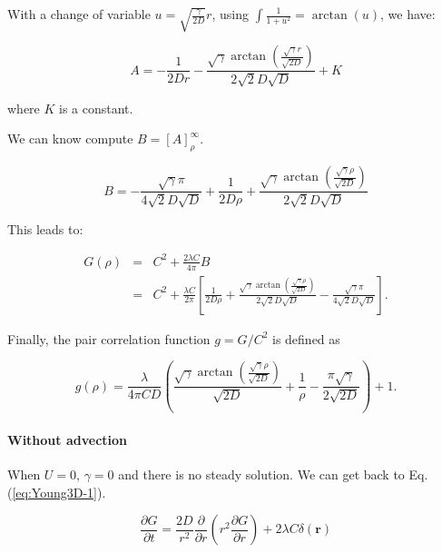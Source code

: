 \documentclass[english]{article}
\begin{document}
With a change of variable $u=\sqrt{\frac{\gamma}{2D}}r$, using $\int\frac{1}{1+u^{2}}=\arctan(u)$,
we have:

\begin{equation}
A=-\frac{1}{2Dr}-\frac{\sqrt{\gamma}\arctan\left(\frac{\sqrt{\gamma}r}{\sqrt{2D}}\right)}{2\sqrt{2}D\sqrt{D}}+K
\end{equation}

where $K$ is a constant.

We can know compute $B=[A]_{\rho}^{\infty}.$ 

\begin{equation}
B=-\frac{\sqrt{\gamma}\pi}{4\sqrt{2}D\sqrt{D}}+\frac{1}{2D\rho}+\frac{\sqrt{\gamma}\arctan\left(\frac{\sqrt{\gamma}\rho}{\sqrt{2D}}\right)}{2\sqrt{2}D\sqrt{D}}
\end{equation}

This leads to:

\begin{equation}
\begin{array}{ccc}
G(\rho) & = & C^{2}+\frac{2\lambda C}{4\pi}B\\
 & = & C^{2}+\frac{\lambda C}{2\pi}\left[\frac{1}{2D\rho}+\frac{\sqrt{\gamma}\arctan\left(\frac{\sqrt{\gamma}\rho}{\sqrt{2D}}\right)}{2\sqrt{2}D\sqrt{D}}-\frac{\sqrt{\gamma}\pi}{4\sqrt{2}D\sqrt{D}}\right].
\end{array}
\end{equation}

Finally, the pair correlation function $g=G/C^{2}$ is defined as

\begin{equation}
g(\rho)=\frac{\lambda}{4\pi CD}\left(\frac{\sqrt{\gamma}\arctan\left(\frac{\sqrt{\gamma}\rho}{\sqrt{2D}}\right)}{\sqrt{2D}}+\frac{1}{\rho}-\frac{\pi\sqrt{\gamma}}{2\sqrt{2D}}\right)+1.\label{eq:pcf_adv_bbm}
\end{equation}


\paragraph{Without advection}

When $U=0$, $\gamma=0$ and there is no steady solution. We can get
back to Eq. (\ref{eq:Young3D-1}). 

\begin{equation}
\frac{\partial G}{\partial t}=\frac{2D}{r^{2}}\frac{\partial}{\partial r}\left(r^{2}\frac{\partial G}{\partial r}\right)+2\lambda C\delta(\boldsymbol{r})
\end{equation}
\end{document}
